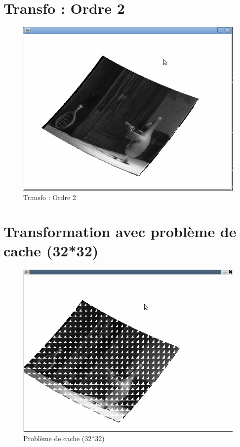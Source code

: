 \documentclass{beamer}
\begin{document}
\section{Transfo : Ordre 2}
\begin{frame}
\begin{figure}[!h]
\centering
\includegraphics[scale = 0.3]{Transfo_ordre_2.png}
\caption{Transfo : Ordre 2}
\end{figure}
\end{frame}


\section{Transformation avec problème de cache (32*32)}
\begin{frame}
\begin{figure}[!h]
\centering
\includegraphics[scale = 0.3]{transfo_pb_cache.png}
\caption{Problème de cache (32*32)}
\end{figure}
\end{frame}
\end{document}
